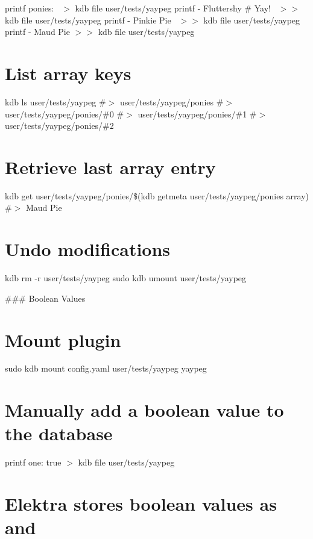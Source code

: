 printf \textquotesingle{}ponies\+:~\newline
\textquotesingle{} $>$ {\ttfamily kdb file user/tests/yaypeg} printf \textquotesingle{} -\/ Fluttershy \# Yay!~\newline
\textquotesingle{} $>$$>$ {\ttfamily kdb file user/tests/yaypeg} printf \textquotesingle{} -\/ Pinkie Pie~\newline
\textquotesingle{} $>$$>$ {\ttfamily kdb file user/tests/yaypeg} printf \textquotesingle{} -\/ Maud Pie\textquotesingle{} $>$$>$ {\ttfamily kdb file user/tests/yaypeg}

\section*{List array keys}

kdb ls user/tests/yaypeg \#$>$ user/tests/yaypeg/ponies \#$>$ user/tests/yaypeg/ponies/\#0 \#$>$ user/tests/yaypeg/ponies/\#1 \#$>$ user/tests/yaypeg/ponies/\#2

\section*{Retrieve last array entry}

kdb get user/tests/yaypeg/ponies/\$(kdb getmeta user/tests/yaypeg/ponies array) \#$>$ Maud Pie

\section*{Undo modifications}

kdb rm -\/r user/tests/yaypeg sudo kdb umount user/tests/yaypeg 
\begin{DoxyCode}
### Boolean Values
\end{DoxyCode}
 \section*{Mount plugin}

sudo kdb mount config.\+yaml user/tests/yaypeg yaypeg

\section*{Manually add a boolean value to the database}

printf \textquotesingle{}one\+: true\textquotesingle{} $>$ {\ttfamily kdb file user/tests/yaypeg}

\section*{Elektra stores boolean values as {} and {}}

